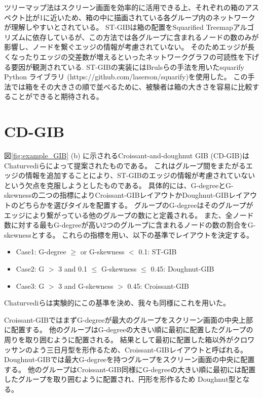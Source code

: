 \documentclass{kuee}
\begin{document}
ツリーマップ法はスクリーン画面を効率的に活用できる上、それぞれの箱のアスペクト比が1に近いため、箱の中に描画されている各グループ内のネットワークが理解しやすいとされている\cite{bruls2000squarified}。
ST-GIBは箱の配置をSquarified Treemapアルゴリズムに依存しているが、この方法では各グループに含まれるノードの数のみが影響し、ノードを繋ぐエッジの情報が考慮されていない。
そのためエッジが長くなったりエッジの交差数が増えるといったネットワークグラフの可読性を下げる要因が観測されている\cite{468391,purchase1997aesthetic,purchase1998performance,purchase2002empirical}.
ST-GIBの実装にはBrulsらの手法を用いたsquarify Python ライブラリ (https://github.com/laserson/squarify)を使用した。
この手法では箱をその大きさの順で並べるために、被験者は箱の大きさを容易に比較することができると期待される。

\section{CD-GIB}
図\ref{fig:example_GIB} (b) に示されるCroissant-and-doughnut GIB (CD-GIB)はChaturvediらによって提案された\cite{chaturvedi2014group}ものである。
これはグループ間をまたがるエッジの情報を追加することにより、ST-GIBのエッジの情報が考慮されていないという欠点を克服しようとしたものである。
具体的には、G-degreeとG-skewnessの二つの指標によりCroissant-GIBレイアウトかDoughnut-GIBレイアウトのどちらかを選びタイルを配置する。
グループのG-degreeはそのグループがエッジにより繋がっている他のグループの数にと定義される。
また、全ノード数に対する最もG-degreeが高い2つのグループに含まれるノードの数の割合をG-skewnessとする。
これらの指標を用い、以下の基準でレイアウトを決定する。
\begin{itemize}
  \item Case1: G-degree $\ge$ or G-skewness $<$ 0.1: ST-GIB
  \item Case2: G $>$ 3 and 0.1 $\le$ G-skewness $\le$ 0.45: Doughnut-GIB
  \item Case3: G $>$ 3 and G-skewness $>$ 0.45: Croissant-GIB
\end{itemize}
Chaturvediらは実験的にこの基準を決め、我々も同様にこれを用いた。

Croissant-GIBではまずG-degreeが最大のグループをスクリーン画面の中央上部に配置する。
他のグループはG-degreeの大きい順に最初に配置したグループの周りを取り囲むように配置される。
結果として最初に配置した箱以外がクロワッサンのよう三日月型を形作るため、Croissant-GIBレイアウトと呼ばれる。
Doughnut-GIBでは最大G-degreeを持つグループをスクリーン画面の中央に配置する。
他のグループはCroissant-GIB同様にG-degreeの大きい順に最初には配置したグループを取り囲むように配置され、円形を形作るため
Doughnut型となる。
\end{document}

